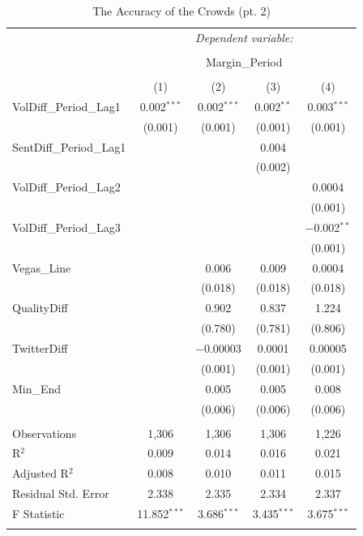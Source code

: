 \documentclass[12pt]{article}
\begin{document}
\begin{doublespacing}
\begin{table}[H] 
\centering 
\caption{The Accuracy of the Crowds (pt. 2)} 
\label{} 
\begin{tabular*}{\textwidth}{@{\extracolsep{\fill}}lcccc} 
\hline 
\hline
 & \multicolumn{4}{c}{\textit{Dependent variable:}} \\ 
\cline{2-5} 
\\[-3.0ex] & \multicolumn{4}{c}{Margin\_Period} \\ 
\\[-1.5ex] & (1) & (2) & (3) & (4)\\ 
\hline
  VolDiff\_Period\_Lag1 & 0.002$^{***}$ & 0.002$^{***}$ & 0.002$^{**}$ & 0.003$^{***}$ \\ 
  & (0.001) & (0.001) & (0.001) & (0.001) \\ 
 SentDiff\_Period\_Lag1 &  &  & 0.004 &  \\ 
  &  &  & (0.002) &  \\ 
 VolDiff\_Period\_Lag2 &  &  &  & 0.0004 \\ 
  &  &  &  & (0.001) \\ 
 VolDiff\_Period\_Lag3 &  &  &  & $-$0.002$^{**}$ \\ 
  &  &  &  & (0.001) \\ 
 Vegas\_Line &  & 0.006 & 0.009 & 0.0004 \\ 
  &  & (0.018) & (0.018) & (0.018) \\ 
 QualityDiff &  & 0.902 & 0.837 & 1.224 \\ 
  &  & (0.780) & (0.781) & (0.806) \\ 
 TwitterDiff &  & $-$0.00003 & 0.0001 & 0.00005 \\ 
  &  & (0.001) & (0.001) & (0.001) \\ 
 Min\_End &  & 0.005 & 0.005 & 0.008 \\ 
  &  & (0.006) & (0.006) & (0.006) \\ 
\hline \\[-1.8ex] 
Observations & 1,306 & 1,306 & 1,306 & 1,226 \\ 
R$^{2}$ & 0.009 & 0.014 & 0.016 & 0.021 \\ 
Adjusted R$^{2}$ & 0.008 & 0.010 & 0.011 & 0.015 \\ 
Residual Std. Error & 2.338 & 2.335 & 2.334 & 2.337 \\ 
F Statistic & 11.852$^{***}$ & 3.686$^{***}$ & 3.435$^{***}$ & 3.675$^{***}$  \\ 
\hline 
\hline \\[-1.8ex] 
\end{tabular*} 
\end{table} 


\end{doublespacing}
\end{document}

